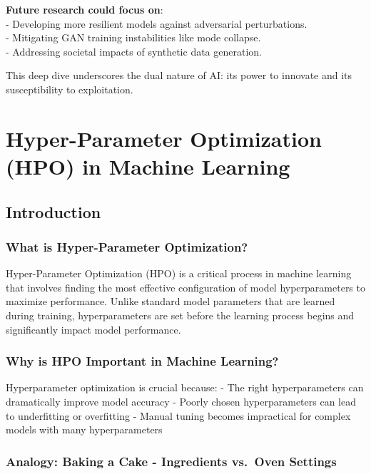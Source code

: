 \documentclass[
  letterpaper,
  DIV=11,
  numbers=noendperiod]{scrreprt}
\begin{document}
\textbf{Future research could focus on}:\\
- Developing more resilient models against adversarial perturbations.\\
- Mitigating GAN training instabilities like mode collapse.\\
- Addressing societal impacts of synthetic data generation.

This deep dive underscores the dual nature of AI: its power to innovate
and its susceptibility to exploitation.


\chapter{Hyper-Parameter Optimization (HPO) in Machine
Learning}\label{hyper-parameter-optimization-hpo-in-machine-learning}

\section{Introduction}\label{introduction-5}

\subsection{What is Hyper-Parameter
Optimization?}\label{what-is-hyper-parameter-optimization}

Hyper-Parameter Optimization (HPO) is a critical process in machine
learning that involves finding the most effective configuration of model
hyperparameters to maximize performance. Unlike standard model
parameters that are learned during training, hyperparameters are set
before the learning process begins and significantly impact model
performance.

\subsection{Why is HPO Important in Machine
Learning?}\label{why-is-hpo-important-in-machine-learning}

Hyperparameter optimization is crucial because: - The right
hyperparameters can dramatically improve model accuracy - Poorly chosen
hyperparameters can lead to underfitting or overfitting - Manual tuning
becomes impractical for complex models with many hyperparameters

\subsection{Analogy: Baking a Cake - Ingredients vs.~Oven
Settings}\label{analogy-baking-a-cake---ingredients-vs.-oven-settings}
\end{document}
